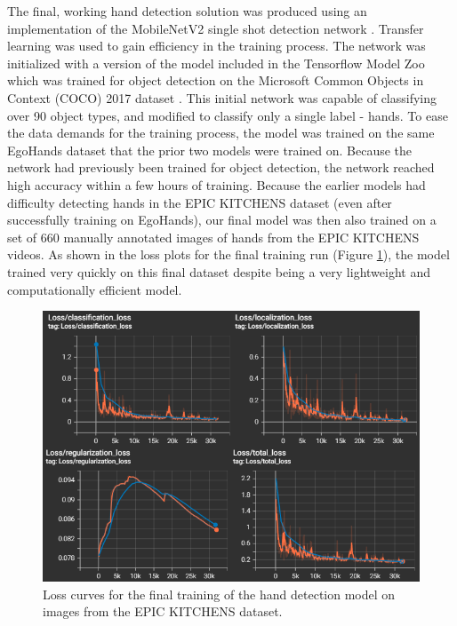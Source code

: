 \documentclass[12pt]{report}
\begin{document}
The final, working hand detection solution was produced using an implementation of the MobileNetV2 single shot detection network \cite{Sandler2018Mobilenetv2:Bottlenecks}. Transfer learning was used to gain efficiency in the training process. The network was initialized with a version of the model included in the Tensorflow Model Zoo which was trained for object detection on the Microsoft Common Objects in Context (COCO) 2017 dataset \cite{Lin2015MicrosoftContext}. This initial network was capable of classifying over 90 object types, and modified to classify only a single label - hands. To ease the data demands for the training process, the model was trained on the same EgoHands dataset that the prior two models were trained on. Because the network had previously been trained for object detection, the network reached high accuracy within a few hours of training. Because the earlier models had difficulty detecting hands in the EPIC KITCHENS dataset (even after successfully training on EgoHands), our final model was then also trained on a set of 660 manually annotated images of hands from the EPIC KITCHENS videos. As shown in the loss plots for the final training run (Figure \ref{hand_training}), the model trained very quickly on this final dataset despite being a very lightweight and computationally efficient model.

\begin{figure}[t]
\centerline{\includegraphics[width=\linewidth]{figure/hand_training.png}}
\caption{Loss curves for the final training of the hand detection model on images from the EPIC KITCHENS dataset.}
\label{hand_training}
\end{figure}
\end{document}
